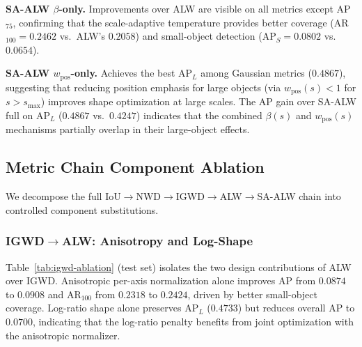 \textbf{SA-ALW $\beta$-only.} Improvements over ALW are visible on all
metrics except AP$_{75}$, confirming that the scale-adaptive temperature
provides better coverage (AR$_{100}=0.2462$ vs.\ ALW's $0.2058$) and
small-object detection (AP$_{S}=0.0802$ vs.\ $0.0654$).

\textbf{SA-ALW $w_{\text{pos}}$-only.} Achieves the best AP$_{L}$ among
Gaussian metrics ($0.4867$), suggesting that reducing position emphasis
for large objects (via $w_{\text{pos}}(s)<1$ for $s>s_{\text{max}}$)
improves shape optimization at large scales. The AP gain over SA-ALW
full on AP$_{L}$ ($0.4867$ vs.\ $0.4247$) indicates that the combined
$\beta(s)$ and $w_{\text{pos}}(s)$ mechanisms partially overlap in their
large-object effects.

\subsection{Metric Chain Component Ablation}
\label{sec:exp-component-ablation}

We decompose the full IoU$\to$NWD$\to$IGWD$\to$ALW$\to$SA-ALW chain into
controlled component substitutions.

\subsubsection{IGWD$\to$ALW: Anisotropy and Log-Shape}

Table~\ref{tab:igwd-ablation} (test set) isolates the two design
contributions of ALW over IGWD. Anisotropic per-axis normalization alone
improves AP from $0.0874$ to $0.0908$ and AR$_{100}$ from $0.2318$ to
$0.2424$, driven by better small-object coverage. Log-ratio shape alone
preserves AP$_{L}$ ($0.4733$) but reduces overall AP to $0.0700$,
indicating that the log-ratio penalty benefits from joint optimization
with the anisotropic normalizer.

\begin{table}[t]
\centering
\caption{IGWD$\to$ALW component ablation (test, seed~42).}
\label{tab:igwd-ablation}
\scriptsize
{}
\end{table}

